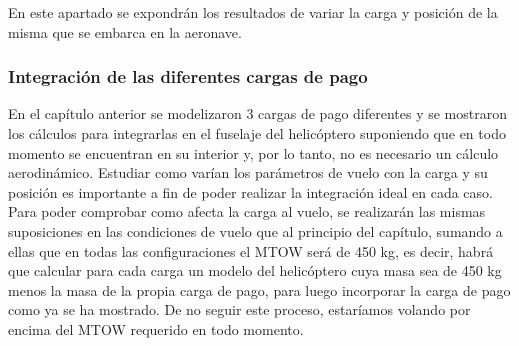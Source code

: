 En este apartado se expondrán los resultados de variar la carga y posición de la misma que se embarca en la aeronave.

\subsubsection*{Integración de las diferentes cargas de pago}

En el capítulo anterior se modelizaron 3 cargas de pago diferentes y se mostraron los cálculos para integrarlas en el fuselaje del helicóptero suponiendo que en todo momento se encuentran en su interior y, por lo tanto, no es necesario un cálculo aerodinámico. Estudiar como varían los parámetros de vuelo con la carga y su posición es importante a fin de poder realizar la integración ideal en cada caso.
Para poder comprobar como afecta la carga al vuelo, se realizarán las mismas suposiciones en las condiciones de vuelo que al principio del capítulo, sumando a ellas que en todas las configuraciones el MTOW será de 450 kg, es decir, habrá que calcular para cada carga un modelo del helicóptero cuya masa sea de 450 kg menos la masa de la propia carga de pago, para luego incorporar la carga de pago como ya se ha mostrado. De no seguir este proceso, estaríamos volando por encima del MTOW requerido en todo momento.

